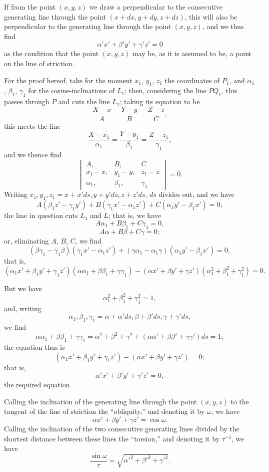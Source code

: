 \documentclass[11pt,a4paper]{article}
\begin{document}
If from the point $(x, y, z)$ we draw a perpendicular to the consecutive generating line through the point $(x + dx, y + dy, z + dz)$, this will also be perpendicular to the generating line through the point $(x, y, z)$, and we thus find
\[
\alpha' x' + \beta' y' + \gamma' z' = 0
\]
as the condition that the point $(x, y, z)$ may be, as it is assumed to be, a point on the line of striction.

For the proof hereof, take for the moment $x_1$, $y_1$, $z_1$ the coordinates of $P_1$, and $\alpha_1$, $\beta_1$, $\gamma_1$ for the cosine-inclinations of $L_1$; then, considering the line $PQ_1$, this passes through $P$ and cuts the line $L_1$; taking its equation to be
\[
\frac{X - x}{A} = \frac{Y - y}{B} = \frac{Z - z}{C},
\]
this meets the line
\[
\frac{X - x_1}{\alpha_1} = \frac{Y - y_1}{\beta_1} = \frac{Z - z_1}{\gamma_1},
\]
and we thence find
\[
\begin{vmatrix}
A, & B, & C \\
x_1 - x, & y_1 - y, & z_1 - z \\
\alpha_1, & \beta_1, & \gamma_1
\end{vmatrix} = 0.
\]
Writing $x_1, y_1, z_1 = x + x'ds, y + y'ds, z + z'ds$, $ds$ divides out, and we have
\[
A(\beta_1 z' - \gamma_1 y') + B(\gamma_1 x' - \alpha_1 z') + C(\alpha_1 y' - \beta_1 x') = 0;
\]
the line in question cuts $L_1$ and $L$; that is, we have
\[
A \alpha_1 + B \beta_1 + C \gamma_1 = 0,
\]
\[
A \alpha + B \beta + C \gamma = 0;
\]
or, eliminating $A$, $B$, $C$, we find
\[
(\beta \gamma_1 - \gamma_1 \beta)(\gamma_1 x' - \alpha_1 z') + (\gamma \alpha_1 - \alpha_1 \gamma)(\alpha_1 y' - \beta_1 x') = 0,
\]
that is,
\[
(\alpha_1 x' + \beta_1 y' + \gamma_1 z')(\alpha\alpha_1 + \beta\beta_1 + \gamma\gamma_1) - (\alpha x' + \beta y' + \gamma z')(\alpha_1^2 + \beta_1^2 + \gamma_1^2) = 0.
\]

But we have
\[
\alpha_1^2 + \beta_1^2 + \gamma_1^2 = 1,
\]
and, writing
\[
\alpha_1, \beta_1, \gamma_1 = \alpha + \alpha' ds, \beta + \beta' ds, \gamma + \gamma' ds,
\]
we find
\[
\alpha\alpha_1 + \beta\beta_1 + \gamma\gamma_1 = \alpha^2 + \beta^2 + \gamma^2 + (\alpha\alpha' + \beta\beta' + \gamma\gamma') ds = 1;
\]
the equation thus is
\[
(\alpha_1 x' + \beta_1 y' + \gamma_1 z') - (\alpha x' + \beta y' + \gamma z') = 0;
\]
that is,
\[
\alpha' x' + \beta' y' + \gamma' z' = 0,
\]
the required equation.

Calling the inclination of the generating line through the point $(x, y, z)$ to the tangent of the line of striction the ``obliquity,'' and denoting it by $\omega$, we have
\[
\alpha x' + \beta y' + \gamma z' = \cos\omega.
\]
Calling the inclination of the two consecutive generating lines divided by the shortest distance between these lines the ``torsion,'' and denoting it by $\tau^{-1}$, we have
\[
\frac{\sin\omega}{\tau} = \sqrt{\alpha'^2 + \beta'^2 + \gamma'^2}.
\]
\end{document}
